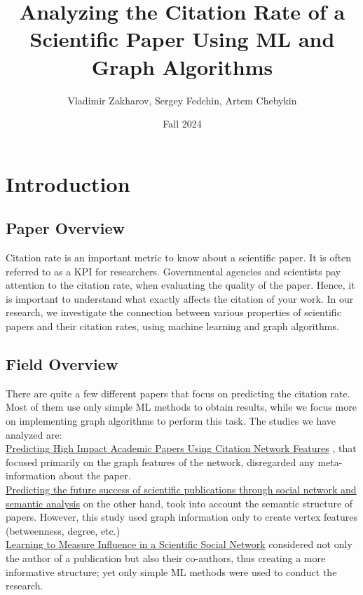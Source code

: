 \documentclass{article}
\title{Analyzing the Citation Rate of a Scientific Paper Using ML and Graph Algorithms}
\author{Vladimir Zakharov, Sergey Fedchin, Artem Chebykin}
\date{Fall 2024}
\newcommand\tab[1][1cm]{\hspace*{#1}}
\begin{document}
\maketitle

\section{Introduction}

\subsection{Paper Overview}

\tab Citation rate is an important metric to know about a scientific paper. It is often referred to as a KPI for researchers. Governmental agencies and scientists pay attention to the citation rate, when evaluating the quality of the paper. Hence, it is important to understand what exactly affects the citation of your work. In our research, we investigate the connection between various properties of scientific papers and their citation rates, using machine learning and graph algorithms. \\

\subsection{Field Overview}
\tab There are quite a few different papers that focus on predicting the citation rate. Most of them use only simple ML methods to obtain results, while we focus more on implementing graph algorithms to perform this task. The studies we have analyzed are: \\

\tab \href{https://link.springer.com/chapter/10.1007/978-3-642-40319-4_2?fromPaywallRec=false}{Predicting High Impact Academic Papers Using Citation Network Features} , that focused primarily on the graph features of the network, disregarded any meta-information about the paper.\\

\tab \href{https://link.springer.com/article/10.1007/s11192-020-03479-5?fromPaywallRec=true}{Predicting the future success of scientific publications through social network and semantic analysis} on the other hand, took into account the semantic structure of papers. However, this study used graph information only to create vertex features (betweenness, degree, etc.)\\

\tab \href{https://link.springer.com/chapter/10.1007/978-3-319-06483-3_4?fromPaywallRec=true}{Learning to Measure Influence in a Scientific Social Network} considered not only the author of a publication but also their co-authors, thus creating a more informative structure; yet only simple ML methods were used to conduct the research.\\
\end{document}
